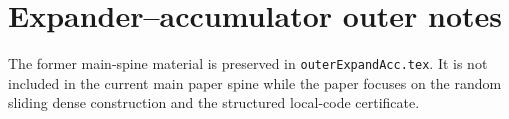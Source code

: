 \section{Expander--accumulator outer notes}
\label{sec:preserved-outer-expand-acc}

The former main-spine material is preserved in \texttt{outerExpandAcc.tex}.  It is not included in the current main paper
spine while the paper focuses on the random sliding dense construction and the structured local-code certificate.
